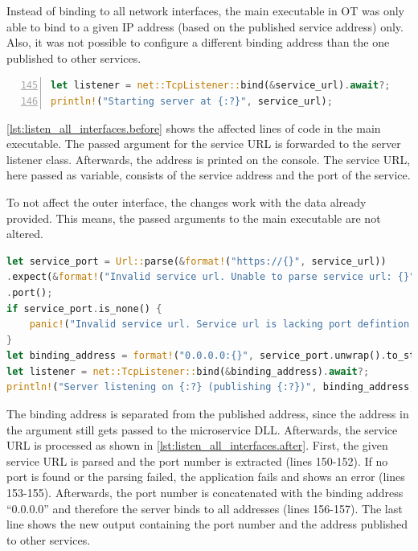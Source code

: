 Instead of binding to all network interfaces, the main executable in \ac{OT} was only able to bind to a given \ac{IP} address (based on the published service address) only. Also, it was not possible to configure a different binding address than the one published to other services.

\begin{lstlisting}[label=lst:listen_all_interfaces.before, caption={Listener binding before the applied changes (\textit{Microservices/OpenTwin/src/main.rs})}, language=rust, firstnumber=145, numbers=left]
let listener = net::TcpListener::bind(&service_url).await?;
println!("Starting server at {:?}", service_url);
\end{lstlisting}
\autoref{lst:listen_all_interfaces.before} shows the affected lines of code in the main executable. The passed argument for the service \ac{URL} is forwarded to the server listener class. Afterwards, the address is printed on the console. The service \ac{URL}, here passed as variable, consists of the service address and the port of the service.

To not affect the outer interface, the changes work with the data already provided. This means, the passed arguments to the main executable are not altered.
\vspace{4em}
\begin{lstlisting}[label=lst:listen_all_interfaces.after, caption={Listener binding after the applied changes. The service url is parsed, based on its port. Binding is done on all interfaces. (\textit{Microservices/OpenTwin/src/main.rs})}, language=rust, firstnumber=150]
let service_port = Url::parse(&format!("https://{}", service_url))
.expect(&format!("Invalid service url. Unable to parse service url: {}", service_url))
.port();
if service_port.is_none() {
	panic!("Invalid service url. Service url is lacking port defintion: {}", service_url);
}
let binding_address = format!("0.0.0.0:{}", service_port.unwrap().to_string());
let listener = net::TcpListener::bind(&binding_address).await?;
println!("Server listening on {:?} (publishing {:?})", binding_address, service_url);
\end{lstlisting}
The binding address is separated from the published address, since the address in the argument still gets passed to the microservice \ac{DLL}. Afterwards, the service \ac{URL} is processed as shown in \autoref{lst:listen_all_interfaces.after}. First, the given service \ac{URL} is parsed and the port number is extracted (lines 150-152). If no port is found or the parsing failed, the application fails and shows an error (lines 153-155). Afterwards, the port number is concatenated with the binding address \enquote{0.0.0.0} and therefore the server binds to all addresses (lines 156-157). The last line shows the new output containing the port number and the address published to other services.


